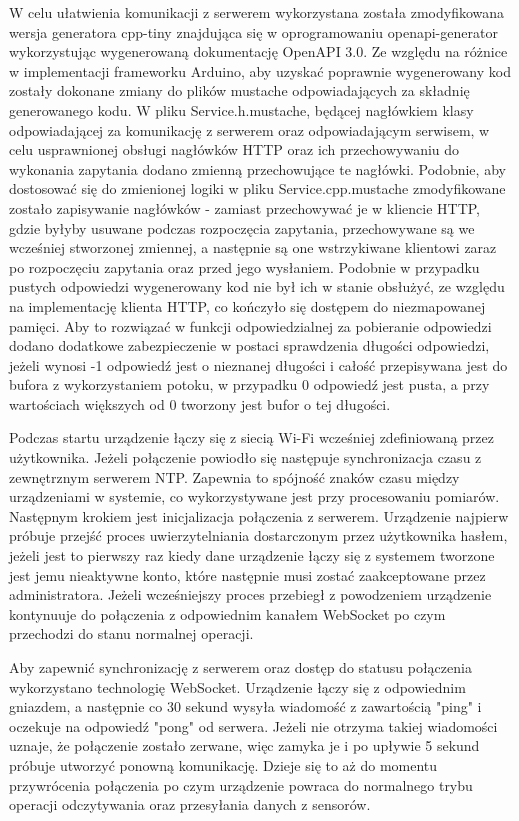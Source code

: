 W celu ułatwienia komunikacji z serwerem wykorzystana została zmodyfikowana wersja
generatora cpp-tiny znajdująca się w oprogramowaniu openapi-generator wykorzystując
wygenerowaną dokumentację OpenAPI 3.0. 
Ze względu na różnice w implementacji frameworku Arduino, aby uzyskać poprawnie 
wygenerowany kod zostały dokonane zmiany do plików mustache odpowiadających za składnię
generowanego kodu. W pliku Service.h.mustache, będącej nagłówkiem klasy odpowiadającej za komunikację z serwerem
oraz odpowiadającym serwisem, w celu usprawnionej obsługi nagłówków
HTTP oraz ich przechowywaniu do wykonania zapytania dodano zmienną przechowujące te nagłówki.
Podobnie, aby dostosować się do zmienionej logiki w pliku Service.cpp.mustache zmodyfikowane
zostało zapisywanie nagłówków - zamiast przechowywać je w kliencie HTTP, gdzie byłyby usuwane podczas
rozpoczęcia zapytania, przechowywane są we wcześniej stworzonej zmiennej, a następnie są one
wstrzykiwane klientowi zaraz po rozpoczęciu zapytania oraz przed jego wysłaniem.
Podobnie w przypadku pustych odpowiedzi wygenerowany kod nie był ich w stanie obsłużyć,
ze względu na implementację klienta HTTP, co kończyło się dostępem do niezmapowanej pamięci. 
Aby to rozwiązać w funkcji odpowiedzialnej 
za pobieranie odpowiedzi dodano dodatkowe zabezpieczenie w postaci sprawdzenia
długości odpowiedzi, jeżeli wynosi -1 odpowiedź jest o nieznanej długości i całość przepisywana jest
do bufora z wykorzystaniem potoku, w przypadku 0 odpowiedź jest pusta, a przy wartościach większych od
0 tworzony jest bufor o tej długości.

Podczas startu urządzenie łączy się z siecią Wi-Fi wcześniej zdefiniowaną przez użytkownika.
Jeżeli połączenie powiodło się następuje synchronizacja czasu z zewnętrznym serwerem NTP.
Zapewnia to spójność znaków czasu między urządzeniami w systemie, co wykorzystywane jest
przy procesowaniu pomiarów. Następnym krokiem jest inicjalizacja połączenia z serwerem.
Urządzenie najpierw próbuje przejść proces uwierzytelniania dostarczonym przez użytkownika
hasłem, jeżeli jest to pierwszy raz kiedy dane urządzenie łączy się z systemem tworzone jest
jemu nieaktywne konto, które następnie musi zostać zaakceptowane przez administratora.
Jeżeli wcześniejszy proces przebiegł z powodzeniem urządzenie kontynuuje do połączenia
z odpowiednim kanałem WebSocket po czym przechodzi do stanu normalnej operacji.

Aby zapewnić synchronizację z serwerem oraz dostęp do statusu połączenia wykorzystano
technologię WebSocket. Urządzenie łączy się z odpowiednim gniazdem, a następnie co 30
sekund wysyła wiadomość z zawartością "ping" i oczekuje na odpowiedź "pong" od serwera.
Jeżeli nie otrzyma takiej wiadomości uznaje, że połączenie zostało zerwane, więc zamyka je
i po upływie 5 sekund próbuje utworzyć ponowną komunikację. Dzieje się to aż do momentu przywrócenia
połączenia po czym urządzenie powraca do normalnego trybu operacji odczytywania oraz
przesyłania danych z sensorów.

